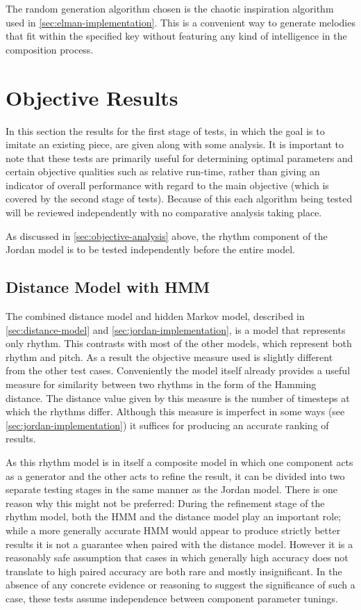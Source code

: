 \documentclass[ author={Stephen Livermore-Tozer},
				supervisor={Dr. Peter Flach},
				degree={MEng},
				title={Algorithmic Co-composition Using Machine Learning},
				subtitle={},
				type={research},
				year={2016} ]{dissertation}
\begin{document}
	The random generation algorithm chosen is the chaotic inspiration algorithm used in \ref{sec:elman-implementation}. This is a convenient way to generate melodies that fit within the specified key without featuring any kind of intelligence in the composition process.
	
	\section{Objective Results}

	In this section the results for the first stage of tests, in which the goal is to imitate an existing piece, are given along with some analysis. It is important to note that these tests are primarily useful for determining optimal parameters and certain objective qualities such as relative run-time, rather than giving an indicator of overall performance with regard to the main objective (which is covered by the second stage of tests). Because of this each algorithm being tested will be reviewed independently with no comparative analysis taking place.
	
	As discussed in \ref{sec:objective-analysis} above, the rhythm component of the Jordan model is to be tested independently before the entire model.
	
	\subsection{Distance Model with HMM}

	The combined distance model and hidden Markov model, described in \ref{sec:distance-model} and \ref{sec:jordan-implementation}, is a model that represents only rhythm. This contrasts with most of the other models, which represent both rhythm and pitch. As a result the objective measure used is slightly different from the other test cases. Conveniently the model itself already provides a useful measure for similarity between two rhythms in the form of the Hamming distance. The distance value given by this measure is the number of timesteps at which the rhythms differ. Although this measure is imperfect in some ways (see \ref{sec:jordan-implementation}) it suffices for producing an accurate ranking of results.
	
	As this rhythm model is in itself a composite model in which one component acts as a generator and the other acts to refine the result, it can be divided into two separate testing stages in the same manner as the Jordan model. There is one reason why this might not be preferred: During the refinement stage of the rhythm model, both the HMM and the distance model play an important role; while a more generally accurate HMM would appear to produce strictly better results it is not a guarantee when paired with the distance model. However it is a reasonably safe assumption that cases in which generally high accuracy does not translate to high paired accuracy are both rare and mostly insignificant. In the absence of any concrete evidence or reasoning to suggest the significance of such a case, these tests assume independence between component parameter tunings.
	
\end{document}
